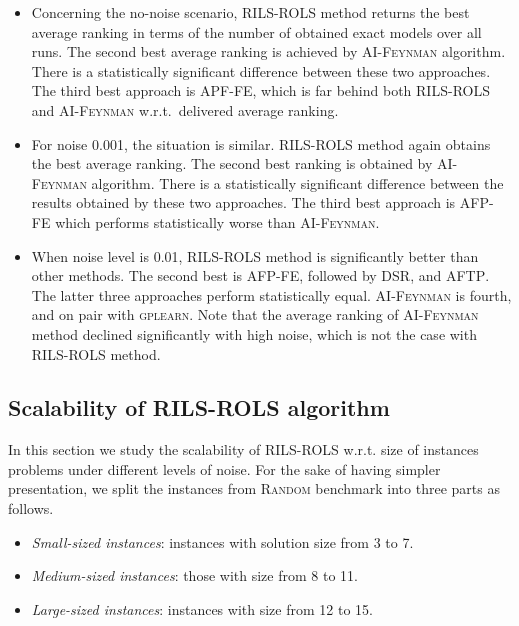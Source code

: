 \documentclass{bmcart}
\begin{document}
\begin{itemize}
	\item  Concerning the no-noise scenario, \textsc{RILS}-\textsc{ROLS} method returns the best average ranking in terms of the number of obtained exact models over all runs.  The second best average ranking is achieved by \textsc{AI-Feynman} algorithm. There is a statistically significant difference between these two approaches. The third best approach is \textsc{APF-FE},  which is far behind both \textsc{RILS}-\textsc{ROLS} and \textsc{AI-Feynman} w.r.t.\ delivered average ranking.  
	\item  For noise 0.001, the situation is similar. \textsc{RILS}-\textsc{ROLS} method again obtains the best average ranking. The second best ranking is obtained by \textsc{AI-Feynman} algorithm. There is a statistically significant difference between the results obtained by these two approaches. The third best approach is \textsc{AFP-FE} which performs statistically worse than \textsc{AI-Feynman}.  
	\item  When noise level is 0.01, \textsc{RILS-ROLS} method is significantly better than other methods. The second best is \textsc{AFP-FE}, followed by \textsc{DSR}, and \textsc{AFTP}. The latter three approaches perform statistically equal. \textsc{AI-Feynman} is fourth, and on pair with \textsc{gplearn}. Note that the average ranking of \textsc{AI-Feynman} method declined significantly with high noise, which is not the case with \textsc{RILS}-\textsc{ROLS} method.   
	
\end{itemize}

\subsection{Scalability of \textsc{RILS}-\textsc{ROLS} algorithm}\label{sec:scalability-rils-rols}

In this section we study the scalability of \textsc{RILS-ROLS} w.r.t. size of instances problems under different levels of noise.  For the sake of having simpler presentation, we split the instances from \textsc{Random} benchmark into three parts as follows. 
\begin{itemize}
	\item \textit{Small-sized instances}: instances with solution size from 3 to 7.
	\item \textit{Medium-sized instances}: those with size from 8 to 11.
	\item \textit{Large-sized instances}: instances with size from 12 to 15. 
\end{itemize}
\end{document}
